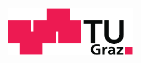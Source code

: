 \vspace*{-1.5cm}
\begin{center}
    \includegraphics[width=3.3cm]{figures/TU_Graz_Logo.pdf}
    
    \vspace*{\spaceone}
    
    {\normalsize \textbf{\thesisauthor\\}}
    
    \vspace*{\spaceone} 
    \LARGE\textbf{\thesistitle}
    
    \vspace*{\spacetwo} 
    \large{\textbf{\thesisdegree\\}}
    
    \vspace*{\spacetwo}
    {\normalsize \textone\\}
    {\normalsize \degreeinfoFull\\}

    \vspace*{\spacetwo}{\normalsize \programinfo\\}
    {\normalsize \studyprogram\\}

    \vspace*{\spacetwo}{\normalsize \texttwo\\}
    \large{\textbf{\universityinfo\\}}
    
    \vspace*{\spaceone}\large{\textbf{\textthree\\}}
    {\normalsize \supervisor\\}

    
    \vspace*{\spacetwo}
    \normalsize \instituteinfo\\
    
    \vspace*{\spaceone}
    \small{\textbf{\submissiontext\\}}
    
\end{center}

\clearpage